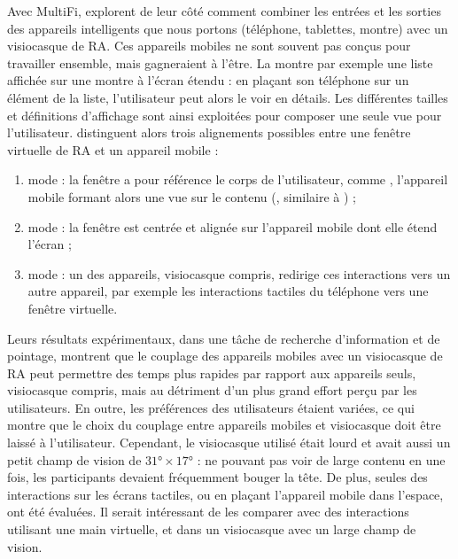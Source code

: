 Avec MultiFi, \cite{Grubert2015} explorent de leur côté comment combiner les entrées et les sorties des appareils intelligents que nous portons (téléphone, tablettes, montre) avec un visiocasque de RA. Ces appareils mobiles ne sont souvent pas conçus pour travailler ensemble, mais gagneraient à l'être. La  montre par exemple une liste affichée sur une montre à l'écran étendu : en plaçant son téléphone sur un élément de la liste, l'utilisateur peut alors le voir en détails. Les différentes tailles et définitions d'affichage sont ainsi exploitées pour composer une seule vue pour l'utilisateur. \citeauthor{Grubert2015} distinguent alors trois alignements possibles entre une fenêtre virtuelle de RA et un appareil mobile  :
\begin{enumerate}
  \item mode  : la fenêtre a pour référence le corps de l'utilisateur, comme \cite{Ens2014}, l'appareil mobile formant alors une vue  sur le contenu (, similaire à \cite{Berge2014}) ;
  \item mode  : la fenêtre est centrée et alignée sur l'appareil mobile dont elle étend l'écran  ;
  \item mode  : un des appareils, visiocasque compris, redirige ces interactions vers un autre appareil, par exemple les interactions tactiles du téléphone vers une fenêtre virtuelle.
\end{enumerate}
\bigskip


Leurs résultats expérimentaux, dans une tâche de recherche d'information et de pointage, montrent que le couplage des appareils mobiles avec un visiocasque de RA peut permettre des temps plus rapides par rapport aux appareils seuls, visiocasque compris, mais au détriment d'un plus grand effort perçu par les utilisateurs. En outre, les préférences des utilisateurs étaient variées, ce qui montre que le choix du couplage entre appareils mobiles et visiocasque doit être laissé à l'utilisateur. Cependant, le visiocasque utilisé était lourd et avait aussi un petit champ de vision de $\ang{31} \times \ang{17}$ : ne pouvant pas voir de large contenu en une fois, les participants devaient fréquemment bouger la tête. De plus, seules des interactions sur les écrans tactiles, ou en plaçant l'appareil mobile dans l'espace, ont été évaluées. Il serait intéressant de les comparer avec des interactions utilisant une main virtuelle, et dans un visiocasque avec un large champ de vision.

